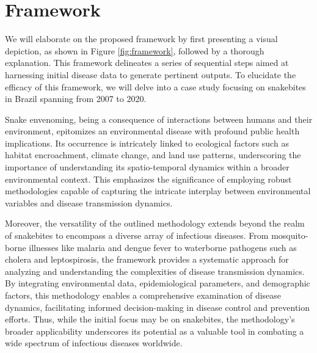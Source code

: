 \documentclass{article}
\begin{document}







\section{Framework}

We will elaborate on the proposed framework by first presenting a visual depiction, as shown in Figure \ref{fig:framework}, followed by a thorough explanation. This framework delineates a series of sequential steps aimed at harnessing initial disease data to generate pertinent outputs. To elucidate the efficacy of this framework, we will delve into a case study focusing on snakebites in Brazil spanning from 2007 to 2020.

Snake envenoming, being a consequence of interactions between humans and their environment, epitomizes an environmental disease with profound public health implications. Its occurrence is intricately linked to ecological factors such as habitat encroachment, climate change, and land use patterns, underscoring the importance of understanding its spatio-temporal dynamics within a broader environmental context. This emphasizes the significance of employing robust methodologies capable of capturing the intricate interplay between environmental variables and disease transmission dynamics.

Moreover, the versatility of the outlined methodology extends beyond the realm of snakebites to encompass a diverse array of infectious diseases. From mosquito-borne illnesses like malaria and dengue fever to waterborne pathogens such as cholera and leptospirosis, the framework provides a systematic approach for analyzing and understanding the complexities of disease transmission dynamics. By integrating environmental data, epidemiological parameters, and demographic factors, this methodology enables a comprehensive examination of disease dynamics, facilitating informed decision-making in disease control and prevention efforts. Thus, while the initial focus may be on snakebites, the methodology's broader applicability underscores its potential as a valuable tool in combating a wide spectrum of infectious diseases worldwide.
\end{document}
